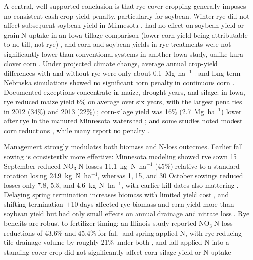 \documentclass[11pt]{article}
\begin{document}
A central, well-supported conclusion is that rye cover cropping generally imposes no consistent cash-crop yield penalty, particularly for soybean. Winter rye did not affect subsequent soybean yield in Minnesota \parencite{Strock2004}, had no effect on soybean yield or grain N uptake in an Iowa tillage comparison (lower corn yield being attributable to no-till, not rye) \parencite{Waring2020}, and corn and soybean yields in rye treatments were not significantly lower than conventional systems in another Iowa study, unlike kura-clover corn \parencite{Qi2011b}. Under projected climate change, average annual crop-yield differences with and without rye were only about 0.1~Mg~ha$^{-1}$ \parencite{Malone2020}, and long-term Nebraska simulations showed no significant corn penalty in continuous corn \parencite{Birru2023}. Documented exceptions concentrate in maize, drought years, and silage: in Iowa, rye reduced maize yield 6\% on average over six years, with the largest penalties in 2012 (34\%) and 2013 (22\%) \parencite{MartinezFeria2016}; corn-silage yield was 16\% (2.7~Mg~ha$^{-1}$) lower after rye in the manured Minnesota watershed \parencite{Krueger2013}; and some studies noted modest corn reductions \parencite{Ruffatti2019,Dougherty2020}, while many report no penalty \parencite{OBrien2022,PrezaFontes2021,Gentry2025}.

Management strongly modulates both biomass and N-loss outcomes. Earlier fall sowing is consistently more effective: Minnesota modeling showed rye sown 15 September reduced NO$_3$-N losses 11.1~kg~N~ha$^{-1}$ (45\%) relative to a standard rotation losing 24.9~kg~N~ha$^{-1}$, whereas 1, 15, and 30 October sowings reduced losses only 7.8, 5.8, and 4.6~kg~N~ha$^{-1}$, with earlier kill dates also mattering \parencite{Feyereisen2006b}. Delaying spring termination increases biomass with limited yield cost \parencite{Birru2023}, and shifting termination $\pm$10 days affected rye biomass and corn yield more than soybean yield but had only small effects on annual drainage and nitrate loss \parencite{Chatterjee2025}. Rye benefits are robust to fertilizer timing: an Illinois study reported NO$_3$-N loss reductions of 43.6\% and 45.4\% for fall- and spring-applied N, with rye reducing tile drainage volume by roughly 21\% under both \parencite{Gupta2022}, and fall-applied N into a standing cover crop did not significantly affect corn-silage yield or N uptake \parencite{Lacey2015}.
\end{document}
